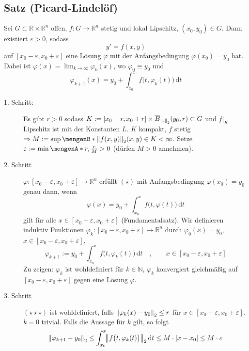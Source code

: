 \subsection[Satz von Picard-Lindelöf (Existenz einer Lösung)]{Satz (Picard-Lindelöf)} %
\label{sub:17}
Sei $G \subset \mathds{R} \times \mathds{R}^n$ offen, $f : G \to \mathds{R}^n$ stetig und lokal Lipschitz, $(x_0, y_0) \in G$. Dann existiert $\varepsilon >0$, sodass 
\[
	y' = f(x,y) \tag{$\star$}
\]
auf $[x_0 - \varepsilon, x_0 + \varepsilon]$ eine Lösung $\varphi$ mit der Anfangsbedingung $\varphi(x_0)= y_0$ hat. Dabei ist 
$\varphi(x)= \lim_{ k \to \infty} \varphi_k(x)$, wo $\varphi_0 \equiv y_0$ und
\[
	\varphi_{k+1} (x) = y_0 + \int_{x_0} ^{x} \! f\big(t, \varphi_k(t)\big)  \, \mathrm{d}t
\]
\begin{description}
	\item[1. Schritt:] Es gibt $r>0$ sodass $K:= [x_0 -r, x_0 +r] \times \overline{B}_{\norm[2]{.} }(y_0,r) \subset G$ und $f|_{K}$ Lipschitz ist mit der Konstanten $L$. 
	$K$ kompakt, $f$ stetig $\Rightarrow M := \sup \set[{\norm[2]{f(x,y)} }]{(x,y) \in K} < \infty $. Setze $\varepsilon := \min \set{r, \frac{r}{M} }>0 $ (dürfen $M>0$
	annehmen). 
	\item[2. Schritt] $\varphi : [x_0 -\varepsilon, x_0 + \varepsilon] \to \mathds{R}^n$ erfüllt $(\star)$ mit Anfangsbedingung $\varphi(x_0)=y_0$ genau dann, wenn 
	\[
		\varphi(x) = y_0 + \int_{x_0} ^{x} \! f\big(t, \varphi(t)\big)  \, \mathrm{d}t \tag{$\star\star$}
	\]
	gilt für alle $x \in  [x_0 - \varepsilon, x_0+ \varepsilon]$ (Fundamentalsatz). Wir definieren induktiv Funktionen 
	$\varphi_k : [x_0 - \varepsilon, x_0 + \varepsilon] \to \mathds{R}^n$ durch $\varphi_0 (x)= y_0$, $x \in [x_0 - \varepsilon, x_0 + \varepsilon]$,
	\[
		\varphi_{k+1} := y_0 + \int_{x_0} ^{x} \! f\big(t, \varphi_k(t)\big)  \, \mathrm{d}t \quad , \qquad x \in[x_0-\varepsilon, x_0 + \varepsilon]\tag{$\star\star\star$}
	\]
	Zu zeigen: $\varphi_k$ ist wohldefiniert für $k \in \mathds{N}$, $\varphi_k$ konvergiert gleichmäßig auf $[x_0 -\varepsilon, x_0 +\varepsilon]$ gegen eine Lösung 
	$\varphi$.
	\item[3. Schritt] $(\star\star\star)$ ist wohldefiniert, falls $\norm[2]{\varphi_k(x)-y_0} \le r $ für $x \in [x_0 -\varepsilon, x_0 +\varepsilon]$. $k=0$ trivial.
	Falls die Aussage für $k$ gilt, so folgt 
	\begin{align*}
		\norm[2]{\varphi_{k+1} -y_0} \le \int_{x_0} ^{x} \! \norm[2]{f\big(t, \varphi_k(t)\big)}  \, \mathrm{d}t \le   M \cdot \abs{x-x_0} \le M \cdot \varepsilon

\end{align*}
\end{description}
